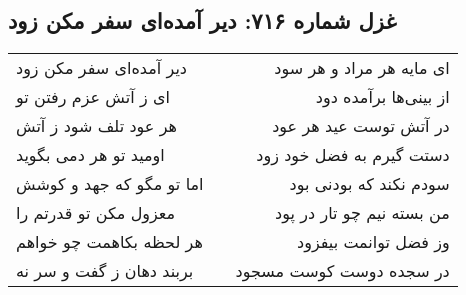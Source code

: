 \begin{center}
\section*{غزل شماره ۷۱۶: دیر آمده‌ای سفر مکن زود}
\label{sec:0716}
\begin{longtable}{l p{0.5cm} r}
دیر آمده‌ای سفر مکن زود
&&
ای مایه هر مراد و هر سود
\\
ای ز آتش عزم رفتن تو
&&
از بینی‌ها برآمده دود
\\
هر عود تلف شود ز آتش
&&
در آتش توست عید هر عود
\\
اومید تو هر دمی بگوید
&&
دستت گیرم به فضل خود زود
\\
اما تو مگو که جهد و کوشش
&&
سودم نکند که بودنی بود
\\
معزول مکن تو قدرتم را
&&
من بسته نیم چو تار در پود
\\
هر لحظه بکاهمت چو خواهم
&&
وز فضل توانمت بیفزود
\\
بربند دهان ز گفت و سر نه
&&
در سجده دوست کوست مسجود
\\
\end{longtable}
\end{center}
